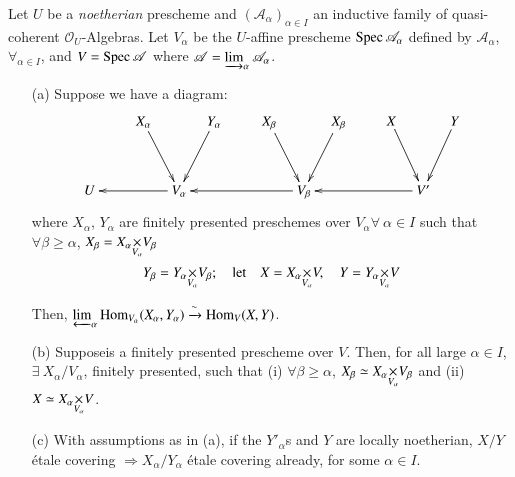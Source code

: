 \setcounter{sublemma}{3}
\begin{sublemma}\label{chap7-lem7.2.1.4}
Let $U$ be a {\em noetherian} prescheme and
$(\mathscr{A}_{\alpha})_{\alpha \in I}$ an inductive family of
quasi-coherent $\mathscr{O}_{U}$-Algebras. Let $V_{\alpha}$ be the
$U$-affine prescheme $\operatorname{Spec} \mathscr{A}_{\alpha}$ defined by
$\mathscr{A}_{\alpha}$, $\forall_{\alpha\in I}$, and
$V=\operatorname{Spec}\mathscr{A}$ where
$\mathscr{A}=\varinjlim_{\alpha}\mathscr{A}_{\alpha}$. 
\begin{itemize}
\item[\rm(a)] Suppose we have a diagram:
\[
\xymatrix@C=.3cm@R=1.2cm{
& & X_{\alpha}\ar[dr] & & Y_{\alpha}\ar[dl] & & X_{\beta}\ar[dr] & &
  X_{\beta}\ar[dl] & & X\ar[dr] & & Y\ar[dl]\\
U & & & V_{\alpha}\ar[lll] & & & & V_{\beta}\ar[llll] & & & & V'\ar[llll]  & 
}
\]
where $X_{\alpha}$, $Y_{\alpha}$ are finitely presented preschemes
over $V_{\alpha} \forall\ \alpha \in I$ such that $\forall\beta\geq
\alpha$, $X_{\beta}=\fprod{X_{\alpha}}{V_{\beta}}{V_{\alpha}}$
$$
Y_{\beta}=\fprod{Y_{\alpha}}{V_{\beta}}{V_{\alpha}};\quad\text{let}\quad
X=\fprod{X_{\alpha}}{V}{V_{\alpha}},\quad Y=\fprod{Y_{\alpha}}{V}{V_{\alpha}}
$$


Then,
$\varprojlim_{\alpha}\operatorname{Hom}_{V_{\alpha}}(X_{\alpha},Y_{\alpha})\xrightarrow{\sim}\operatorname{Hom}_{V}(X,Y)$.

\item[\rm(b)] Suppose\pageoriginale is a finitely presented prescheme
  over $V$. Then, for all large $\alpha\in I$, $\exists\
  X_{\alpha}/V_{\alpha}$, finitely presented, such that (i) $\forall
  \beta\geq \alpha$, $X_{\beta}\simeq
  \fprod{X_{\alpha}}{V_{\beta}}{V_{\alpha}}$ and (ii) $X\simeq
  \fprod{X_{\alpha}}{V}{V_{\alpha}}$.

\item[\rm(c)] With assumptions as in (a), if the $Y'_{\alpha}$s and $Y$ are
  locally noetherian, $X/Y$ \'etale covering $\Rightarrow
  X_{\alpha}/Y_{\alpha}$ \'etale covering already, for some $\alpha\in I$. 
\end{itemize}
\end{sublemma}


